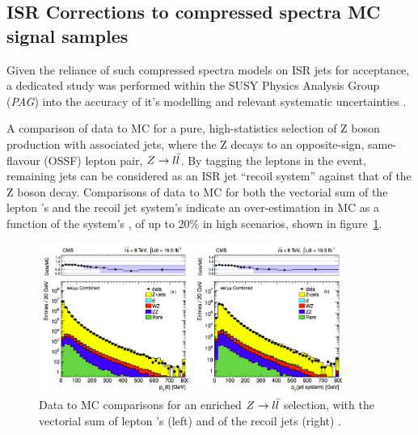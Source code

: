 

\subsection{ISR Corrections to compressed spectra MC signal samples}
\label{sec:isr_reweighting}

Given the reliance of such compressed spectra models on ISR jets for acceptance,
a dedicated study was performed within the SUSY Physics Analysis Group (\emph{PAG})
into the accuracy of it's modelling and relevant systematic uncertainties \cite{susy-isrrw}.

A comparison of data to MC for a pure, high-statistics selection
of Z boson production with associated jets, where the Z decays to an opposite-sign,
same-flavour (OSSF) lepton pair, $Z\rightarrow l\bar{l}$. By tagging the leptons in 
the event, remaining jets can be considered as an ISR jet ``recoil system'' 
against that of the Z boson decay. Comparisons of data to MC for both the 
vectorial sum of the lepton \Ptvect's and the recoil jet system's \Ptvect indicate an
over-estimation in MC as a function of the system's \Pt, of up to 20\% in 
high \Pt scenarios, shown in figure~\ref{fig:isr_datamc}.

\begin{figure}[t!]
    \centering
    \includegraphics[width=0.9\textwidth]{Figs/isr/isr_zjets_distros.pdf}
    \caption{Data to MC comparisons for an enriched $Z \rightarrow l\bar{l}$ selection, 
    with the vectorial sum of lepton \Pt's (left) and of the recoil jets (right)
    \cite{susy-isrrw}.}
    \label{fig:isr_datamc}
\end{figure}

